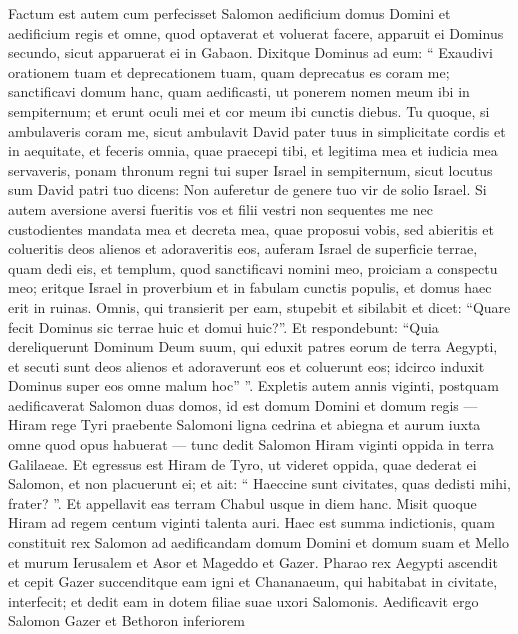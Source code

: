\begin{biblechapter}
\begin{biblechapter}
\begin{biblechapter}
\begin{biblechapter}
\begin{biblechapter}
\begin{biblechapter}
\begin{biblechapter}
\begin{biblechapter}
\begin{biblechapter}
\verse Factum est autem cum perfecisset Salomon aedificium domus Domini et aedificium regis et omne, quod optaverat et voluerat facere, 
\verse apparuit ei Dominus secundo, sicut apparuerat ei in Gabaon. 
\verse Dixitque Dominus ad eum: “ Exaudivi orationem tuam et deprecationem tuam, quam deprecatus es coram me; sanctificavi domum hanc, quam aedificasti, ut ponerem nomen meum ibi in sempiternum; et erunt oculi mei et cor meum ibi cunctis diebus. 
\verse Tu quoque, si ambulaveris coram me, sicut ambulavit David pater tuus in simplicitate cordis et in aequitate, et feceris omnia, quae praecepi tibi, et legitima mea et iudicia mea servaveris, 
\verse ponam thronum regni tui super Israel in sempiternum, sicut locutus sum David patri tuo dicens: Non auferetur de genere tuo vir de solio Israel. 
\verse Si autem aversione aversi fueritis vos et filii vestri non sequentes me nec custodientes mandata mea et decreta mea, quae proposui vobis, sed abieritis et colueritis deos alienos et adoraveritis eos, 
 \verse auferam Israel de superficie terrae, quam dedi eis, et templum, quod sanctificavi nomini meo, proiciam a conspectu meo; eritque Israel in proverbium et in fabulam cunctis populis, 
\verse et domus haec erit in ruinas. Omnis, qui transierit per eam, stupebit et sibilabit et dicet: “Quare fecit Dominus sic terrae huic et domui huic?”. 
\verse Et respondebunt: “Quia dereliquerunt Dominum Deum suum, qui eduxit patres eorum de terra Aegypti, et secuti sunt deos alienos et adoraverunt eos et coluerunt eos; idcirco induxit Dominus super eos omne malum hoc” ”.
 \verse Expletis autem annis viginti, postquam aedificaverat Salomon duas domos, id est domum Domini et domum regis 
\verse — Hiram rege Tyri praebente Salomoni ligna cedrina et abiegna et aurum iuxta omne quod opus habuerat — tunc dedit Salomon Hiram viginti oppida in terra Galilaeae. 
\verse Et egressus est Hiram de Tyro, ut videret oppida, quae dederat ei Salomon, et non placuerunt ei; 
\verse et ait: “ Haeccine sunt civitates, quas dedisti mihi, frater? ”. Et appellavit eas terram Chabul usque in diem hanc. 
\verse Misit quoque Hiram ad regem centum viginti talenta auri.
 \verse Haec est summa indictionis, quam constituit rex Salomon ad aedificandam domum Domini et domum suam et Mello et murum Ierusalem et Asor et Mageddo et Gazer. 
 \verse Pharao rex Aegypti ascendit et cepit Gazer succenditque eam igni et Chananaeum, qui habitabat in civitate, interfecit; et dedit eam in dotem filiae suae uxori Salomonis. 
\verse Aedificavit ergo Salomon Gazer et Bethoron inferiorem 

\end{biblechapter}
\end{biblechapter}
\end{biblechapter}
\end{biblechapter}
\end{biblechapter}
\end{biblechapter}
\end{biblechapter}
\end{biblechapter}
\end{biblechapter}
